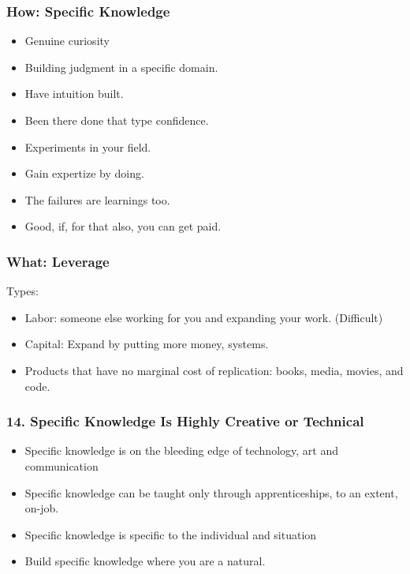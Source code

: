 \begin{frame}[fragile]
\frametitle{How: Specific Knowledge}
\begin{itemize}
\item Genuine curiosity
\item Building judgment in a specific domain. 
\item Have intuition built. 
\item Been there done that type confidence.
\item Experiments in your field. 
\item Gain expertize by doing. 
\item The failures are learnings too.
\item Good, if, for that also, you can get paid.
\end{itemize}
\end{frame}

\begin{frame}[fragile]
\frametitle{What: Leverage}
Types:
\begin{itemize}
\item Labor: someone else working for you and expanding your work. (Difficult)
\item Capital: Expand by putting more money, systems.
\item Products that have no marginal cost of replication: books, media, movies, and code.
\end{itemize}
\end{frame}


\begin{frame}[fragile]
\frametitle{14. Specific Knowledge Is Highly Creative or Technical}
\begin{itemize}
\item Specific knowledge is on the bleeding edge of technology, art and communication
\item Specific knowledge can be taught only through apprenticeships, to an extent, on-job.
\item Specific knowledge is specific to the individual and situation
\item Build specific knowledge where you are a natural.
\end{itemize}
\end{frame}


